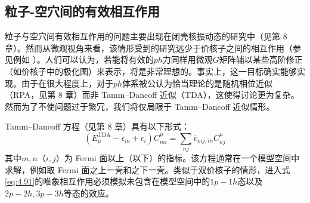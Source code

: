 \subsection{粒子-空穴间的有效相互作用}

粒子与空穴间有效相互作用的问题主要出现在闭壳核振动态的研究中（见第 8 章）。然而从微观视角来看，该情形受到的研究远少于价核子之间的相互作用（参见例如
\cite{BK69,KBB70}）。人们可以认为，若能将有效的$ph$力同样用微观$G$矩阵辅以某些高阶修正（如价核子中的极化图）来表示，将是非常理想的。事实上，这一目标确实能够实现。由于在很大程度上，对于$ph$体系被公认为恰当理论的是随机相位近似（RPA，见第
8 章）而非 Tamm–Dancoff 近似（TDA），这使得讨论更为复杂。然而为了不使问题过于繁冗，我们将仅局限于 Tamm–Dancoff
近似情形。

Tamm–Dancoff 方程（见第 8 章）具有以下形式：
\begin{equation}
(E^{\text{TDA}}_{\mu}-\epsilon_{m}+\epsilon_{i})C^{\mu}_{mi}=\sum_{nj}\bar{v}_{mj,in}C^{\mu}_{nj}\label{eq:4.91}
\end{equation}
其中$m,n$（$i,j$）为 Fermi 面以上（以下）的指标。该方程通常在一个模型空间中求解，例如取 Fermi 面之上一壳和之下一壳。类似于双价核子的情形，进入式\ref{eq:4.91}的唯象相互作用必须模拟未包含在模型空间中的$1p-1h$态以及$2p-2h,3p-3h$等态的效应。

